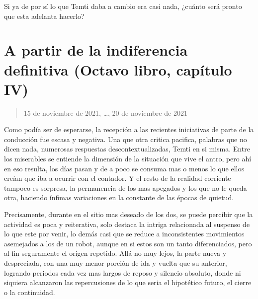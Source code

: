 \documentclass[
]{book}
\begin{document}
Si ya de por sí lo que Temti daba a cambio era casi nada, ¿cuánto será pronto que esta adelanta hacerlo?

\hypertarget{a-partir-de-la-indiferencia-definitiva-octavo-libro-capuxedtulo-iv}{%
\section{A partir de la indiferencia definitiva (Octavo libro, capítulo IV)}\label{a-partir-de-la-indiferencia-definitiva-octavo-libro-capuxedtulo-iv}}

\begin{quote}
15 de noviembre de 2021, \ldots, 20 de noviembre de 2021
\end{quote}

Como podía ser de esperarse, la recepción a las recientes iniciativas de parte de la conducción fue escasa y negativa. Una que otra critica pacifica, palabras que no dicen nada, numerosas respuestas descontextualizadas, Temti en si misma. Entre los miserables se entiende la dimensión de la situación que vive el antro, pero ahí en eso resulta, los días pasan y de a poco se consuma mas o menos lo que ellos creían que iba a ocurrir con el contador. Y el resto de la realidad corriente tampoco es sorpresa, la permanencia de los mas apegados y los que no le queda otra, haciendo ínfimas variaciones en la constante de las épocas de quietud.

Precisamente, durante en el sitio mas deseado de los dos, se puede percibir que la actividad es poca y reiterativa, solo destaca la intriga relacionada al suspenso de lo que este por venir, lo demás casi que se reduce a inconsistentes movimientos asemejados a los de un robot, aunque en si estos son un tanto diferenciados, pero al fin seguramente el origen repetido. Allá no muy lejos, la parte nueva y despreciada, con una muy menor porción de ida y vuelta que su anterior, logrando periodos cada vez mas largos de reposo y silencio absoluto, donde ni siquiera alcanzaron las repercusiones de lo que seria el hipotético futuro, el cierre o la continuidad.
\end{document}
